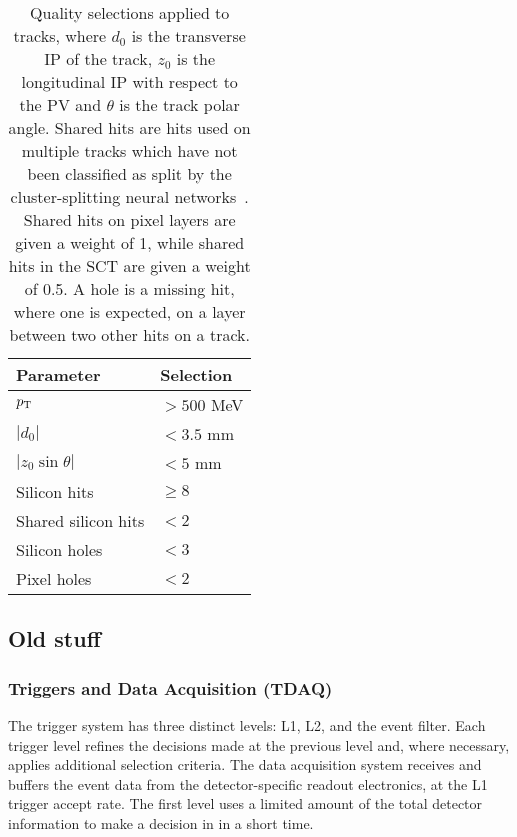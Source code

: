 \begin{table}[!htbp]
    \small
    \centering
    \caption{
        Quality selections applied to tracks,
        where $d_0$ is the transverse IP of the track, $z_0$ is the longitudinal IP with respect to the PV and $\theta$ is the track polar angle.
        Shared hits are hits used on multiple tracks which have not been classified as split by the cluster-splitting neural networks~\cite{PERF-2015-08}.
        Shared hits on pixel layers are given a weight of 1, while shared hits in the SCT are given a weight of 0.5.
        A hole is a missing hit, where one is expected, on a layer between two other hits on a track.
        }
    \begin{tabular}{ll}
        \toprule 
        \textbf{Parameter} & \textbf{Selection} \\
        \hline
        $p_{\text{T}}$                & $> 500$ MeV \\
        $|d_0|$              & $< 3.5$ mm \\
        $|z_0 \sin\theta|$   & $< 5$ mm \\
        Silicon hits         & $\ge 8$ \\
        Shared silicon hits  & $< 2$ \\
        Silicon holes        & $< 3$ \\
        Pixel holes          & $< 2$ \\
        \bottomrule
    \end{tabular}
    \vspace{4mm}
    \label{tab:track_selections}
\end{table}

\subsection{Old stuff}


\subsubsection{Triggers and Data Acquisition (TDAQ)}

The trigger system has three distinct levels: L1, L2, and the event filter. Each trigger level refines the decisions made at the previous level and, where necessary, applies additional selection criteria. The data acquisition system receives and buffers the event data from the detector-specific readout electronics, at the L1 trigger accept rate. The first level uses a limited amount of the total detector information to make a decision in in a short time.


